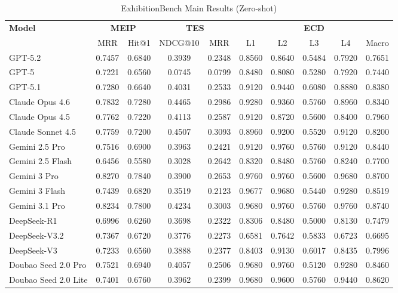 \begin{table}[ht]
\centering
\caption{ExhibitionBench Main Results (Zero-shot)}
\label{tab:main-results}
\begin{tabular}{l|cc|cc|ccccc}
\toprule
\textbf{Model} & \multicolumn{2}{c|}{\textbf{MEIP}} & \multicolumn{2}{c|}{\textbf{TES}} & \multicolumn{5}{c}{\textbf{ECD}} \\
 & MRR & Hit@1 & NDCG@10 & MRR & L1 & L2 & L3 & L4 & Macro \\
\midrule
GPT-5.2 & 0.7457 & 0.6840 & 0.3939 & 0.2348 & 0.8560 & 0.8640 & 0.5484 & 0.7920 & 0.7651 \\
GPT-5 & 0.7221 & 0.6560 & 0.0745 & 0.0799 & 0.8480 & 0.8080 & 0.5280 & 0.7920 & 0.7440 \\
GPT-5.1 & 0.7280 & 0.6640 & 0.4031 & 0.2533 & 0.9120 & 0.9440 & 0.6080 & 0.8880 & 0.8380 \\
Claude Opus 4.6 & 0.7832 & 0.7280 & 0.4465 & 0.2986 & 0.9280 & 0.9360 & 0.5760 & 0.8960 & 0.8340 \\
Claude Opus 4.5 & 0.7762 & 0.7220 & 0.4113 & 0.2587 & 0.9120 & 0.8720 & 0.5600 & 0.8400 & 0.7960 \\
Claude Sonnet 4.5 & 0.7759 & 0.7200 & 0.4507 & 0.3093 & 0.8960 & 0.9200 & 0.5520 & 0.9120 & 0.8200 \\
Gemini 2.5 Pro & 0.7516 & 0.6900 & 0.3963 & 0.2421 & 0.9120 & 0.9760 & 0.5760 & 0.9120 & 0.8440 \\
Gemini 2.5 Flash & 0.6456 & 0.5580 & 0.3028 & 0.2642 & 0.8320 & 0.8480 & 0.5760 & 0.8240 & 0.7700 \\
Gemini 3 Pro & 0.8270 & 0.7840 & 0.3900 & 0.2653 & 0.9760 & 0.9760 & 0.5600 & 0.9680 & 0.8700 \\
Gemini 3 Flash & 0.7439 & 0.6820 & 0.3519 & 0.2123 & 0.9677 & 0.9680 & 0.5440 & 0.9280 & 0.8519 \\
Gemini 3.1 Pro & 0.8234 & 0.7800 & 0.4234 & 0.3003 & 0.9680 & 0.9760 & 0.5760 & 0.9760 & 0.8740 \\
DeepSeek-R1 & 0.6996 & 0.6260 & 0.3698 & 0.2322 & 0.8306 & 0.8480 & 0.5000 & 0.8130 & 0.7479 \\
DeepSeek-V3.2 & 0.7367 & 0.6720 & 0.3776 & 0.2273 & 0.6581 & 0.7642 & 0.5833 & 0.6723 & 0.6695 \\
DeepSeek-V3 & 0.7233 & 0.6560 & 0.3888 & 0.2377 & 0.8403 & 0.9130 & 0.6017 & 0.8435 & 0.7996 \\
Doubao Seed 2.0 Pro & 0.7521 & 0.6940 & 0.4057 & 0.2506 & 0.9680 & 0.9760 & 0.5120 & 0.9280 & 0.8460 \\
Doubao Seed 2.0 Lite & 0.7401 & 0.6760 & 0.3962 & 0.2399 & 0.9680 & 0.9600 & 0.5760 & 0.9440 & 0.8620 \\

\end{tabular}
\end{table}
